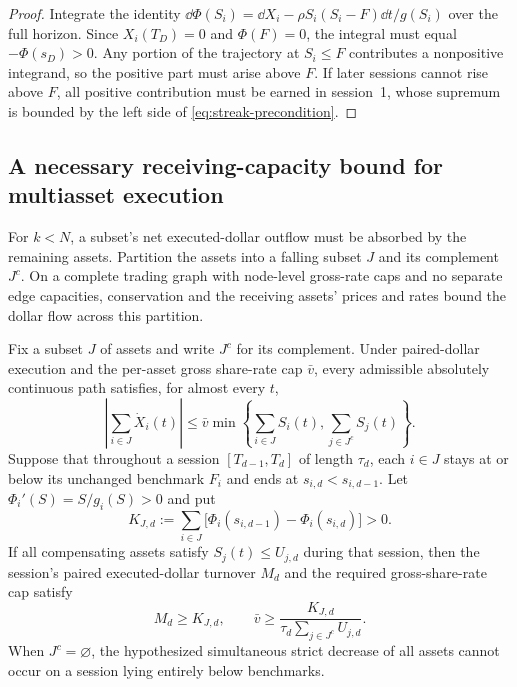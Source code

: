 \documentclass[review,hidelinks,onefignum,onetabnum]{siamonline250211}
\begin{document}
\begin{proof}
Integrate the identity $\dd\Phi(S_i)=\dd X_i-\rho S_i(S_i-F)\dd t/g(S_i)$ over the full horizon. Since $X_i(T_D)=0$ and $\Phi(F)=0$, the integral must equal $-\Phi(s_D)>0$. Any portion of the trajectory at $S_i\le F$ contributes a nonpositive integrand, so the positive part must arise above $F$. If later sessions cannot rise above $F$, all positive contribution must be earned in session~1, whose supremum is bounded by the left side of \eqref{eq:streak-precondition}.
\end{proof}


\subsection{A necessary receiving-capacity bound for multiasset execution}\label{subsec:multiday-cut}
For $k<N$, a subset's net executed-dollar outflow must be absorbed by the remaining assets. Partition the assets into a falling subset $J$ and its complement $J^c$. On a complete trading graph with node-level gross-rate caps and no separate edge capacities, conservation and the receiving assets' prices and rates bound the dollar flow across this partition.
\begin{proposition}\label{prop:market-cut}
Fix a subset $J$ of assets and write $J^c$ for its complement. Under paired-dollar execution and the per-asset gross share-rate cap $\bar v$, every admissible absolutely continuous path satisfies, for almost every $t$,
\begin{equation}\label{eq:market-cut-instant}
\left|\sum_{i\in J}\dot X_i(t)\right|\le
\bar v\min\left\{\sum_{i\in J} S_i(t),\sum_{j\in J^c}S_j(t)\right\}.
\end{equation}
Suppose that throughout a session $[T_{d-1},T_d]$ of length $\tau_d$, each $i\in J$ stays at or below its unchanged benchmark $F_i$ and ends at $s_{i,d}<s_{i,d-1}$. Let $\Phi_i'(S)=S/g_i(S)>0$ and put
\begin{equation}\label{eq:cut-required}
K_{J,d}:=\sum_{i\in J}\big[\Phi_i(s_{i,d-1})-\Phi_i(s_{i,d})\big]>0.
\end{equation}
If all compensating assets satisfy $S_j(t)\le U_{j,d}$ during that session, then the session's paired executed-dollar turnover $M_d$ and the required gross-share-rate cap satisfy
\begin{equation}\label{eq:cut-necessary}
M_d\ge K_{J,d},\qquad
\bar v\ge\frac{K_{J,d}}{\tau_d\sum_{j\in J^c}U_{j,d}}.
\end{equation}
When $J^c=\varnothing$, the hypothesized simultaneous strict decrease of all assets cannot occur on a session lying entirely below benchmarks.
\end{proposition}
\end{document}
